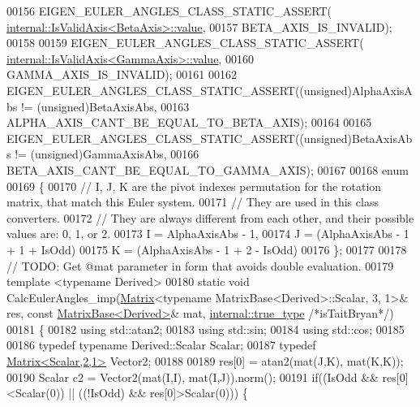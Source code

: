 \begin{DoxyCode}
00156     EIGEN\_EULER\_ANGLES\_CLASS\_STATIC\_ASSERT(
      \hyperlink{struct_eigen_1_1internal_1_1_is_valid_axis}{internal::IsValidAxis<BetaAxis>::value},
00157       BETA\_AXIS\_IS\_INVALID);
00158       
00159     EIGEN\_EULER\_ANGLES\_CLASS\_STATIC\_ASSERT(
      \hyperlink{struct_eigen_1_1internal_1_1_is_valid_axis}{internal::IsValidAxis<GammaAxis>::value},
00160       GAMMA\_AXIS\_IS\_INVALID);
00161       
00162     EIGEN\_EULER\_ANGLES\_CLASS\_STATIC\_ASSERT((\textcolor{keywordtype}{unsigned})AlphaAxisAbs != (\textcolor{keywordtype}{unsigned})BetaAxisAbs,
00163       ALPHA\_AXIS\_CANT\_BE\_EQUAL\_TO\_BETA\_AXIS);
00164       
00165     EIGEN\_EULER\_ANGLES\_CLASS\_STATIC\_ASSERT((\textcolor{keywordtype}{unsigned})BetaAxisAbs != (\textcolor{keywordtype}{unsigned})GammaAxisAbs,
00166       BETA\_AXIS\_CANT\_BE\_EQUAL\_TO\_GAMMA\_AXIS);
00167 
00168     \textcolor{keyword}{enum}
00169     \{
00170       \textcolor{comment}{// I, J, K are the pivot indexes permutation for the rotation matrix, that match this Euler system. }
00171       \textcolor{comment}{// They are used in this class converters.}
00172       \textcolor{comment}{// They are always different from each other, and their possible values are: 0, 1, or 2.}
00173       I = AlphaAxisAbs - 1,
00174       J = (AlphaAxisAbs - 1 + 1 + IsOdd)%
00175       K = (AlphaAxisAbs - 1 + 2 - IsOdd)%
00176     \};
00177     
00178     \textcolor{comment}{// TODO: Get @mat parameter in form that avoids double evaluation.}
00179     \textcolor{keyword}{template} <\textcolor{keyword}{typename} Derived>
00180     \textcolor{keyword}{static} \textcolor{keywordtype}{void} CalcEulerAngles\_imp(\hyperlink{group___core___module_class_eigen_1_1_matrix}{Matrix}<\textcolor{keyword}{typename} MatrixBase<Derived>::Scalar, 3, 1>& res, \textcolor{keyword}{const} 
      \hyperlink{group___core___module_class_eigen_1_1_matrix_base}{MatrixBase<Derived>}& mat, \hyperlink{struct_eigen_1_1internal_1_1true__type}{internal::true\_type} \textcolor{comment}{/*isTaitBryan*/})
00181     \{
00182       \textcolor{keyword}{using} std::atan2;
00183       \textcolor{keyword}{using} std::sin;
00184       \textcolor{keyword}{using} std::cos;
00185       
00186       \textcolor{keyword}{typedef} \textcolor{keyword}{typename} Derived::Scalar Scalar;
00187       \textcolor{keyword}{typedef} \hyperlink{group___core___module_class_eigen_1_1_matrix}{Matrix<Scalar,2,1>} Vector2;
00188       
00189       res[0] = atan2(mat(J,K), mat(K,K));
00190       Scalar c2 = Vector2(mat(I,I), mat(I,J)).norm();
00191       \textcolor{keywordflow}{if}((IsOdd && res[0]<Scalar(0)) || ((!IsOdd) && res[0]>Scalar(0))) \{

\end{DoxyCode}
